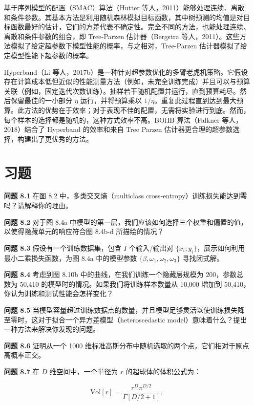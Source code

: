 \documentclass[lang=cn,newtx,10pt,scheme=chinese]{elegantbook}
\begin{document}
基于序列模型的配置（SMAC）算法（Hutter 等人，2011）能够处理连续、离散和条件参数。其基本方法是利用随机森林模拟目标函数，其中树预测的均值是对目标函数最好的估计，它们的方差代表不确定性。完全不同的方法，也能处理连续、离散和条件参数的组合，即 Tree-Parzen 估计器（Bergstra 等人，2011）。这些方法模拟了给定超参数下模型性能的概率，与之相对，Tree-Parzen 估计器模拟了给定模型性能下超参数的概率。

Hyperband（Li 等人，2017b）是一种针对超参数优化的多臂老虎机策略。它假设存在计算成本低但近似的性能测量方法（例如，未完全训练完成）并且可以与预算关联（例如，固定迭代次数训练）。抽样若干随机配置并运行，直到预算耗尽。然后保留最佳的一小部分 \(\eta\) 运行，并将预算乘以 \(1/\eta\)。重复此过程直到达到最大预算。此方法的优势在于效率；对于表现不佳的配置，无需将实验进行到底。然而，每个样本的选择都是随机的，这种方式效率不高。BOHB 算法（Falkner 等人，2018）结合了 Hyperband 的效率和来自 Tree Parzen 估计器更合理的超参数选择，构建出了更优秀的方法。
\section{习题}
\textbf{问题 8.1} 在图 8.2 中，多类交叉熵（multiclass cross-entropy）训练损失能达到零吗？请解释你的理由。

\textbf{问题 8.2} 对于图 8.4a 中模型的第一层，我们应该如何选择三个权重和偏置的值，以使得隐藏单元的响应符合图 8.4b-d 所描绘的情况？

\textbf{问题 8.3} 假设有一个训练数据集，包含 \( I \) 个输入/输出对 \( \{x_i; y_i\} \)，展示如何利用最小二乘损失函数，为图 8.4a 中的模型参数 \( \{\beta, \omega_1, \omega_2, \omega_3\} \) 寻找闭式解。

\textbf{问题 8.4} 考虑到图 8.10b 中的曲线，在我们训练一个隐藏层规模为 200，参数总数为 50,410 的模型时的情况。如果我们将训练样本数量从 10,000 增加到 50,410，你认为训练和测试性能会怎样变化？

\textbf{问题 8.5} 当模型容量超过训练数据点的数量，并且模型足够灵活以使训练损失降至零时，这对于拟合一个异方差模型（heteroscedastic model）意味着什么？提出一种方法来解决你发现的问题。

\textbf{问题 8.6} 证明从一个 1000 维标准高斯分布中随机选取的两个点，它们相对于原点高概率正交。

\textbf{问题 8.7} 在 \( D \) 维空间中，一个半径为 \( r \) 的超球体的体积公式为：

\begin{equation}
\text{Vol}[r] = \frac{r^D \pi^{D/2}}{\Gamma[D/2 + 1]}, 
\end{equation}
\end{document}
